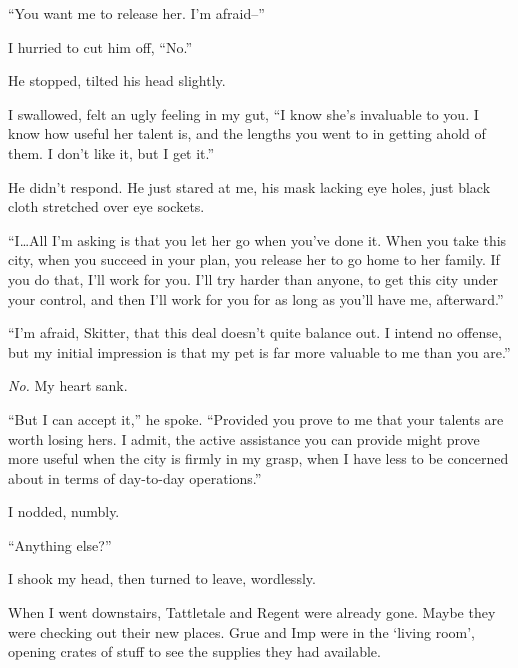 ``You want me to release her.  I'm afraid--''



I hurried to cut him off, ``No.''



He stopped, tilted his head slightly.



I swallowed, felt an ugly feeling in my gut, ``I know she's invaluable to you.  I know how useful her talent is, and the lengths you went to in getting ahold of them.  I don't like it, but I get it.''



He didn't respond.  He just stared at me, his mask lacking eye holes, just black cloth stretched over eye sockets.



``I\ldots All I'm asking is that you let her go when you've done it.  When you take this city, when you succeed in your plan, you release her to go home to her family.  If you do that, I'll work for you.  I'll try harder than anyone, to get this city under your control, and then I'll work for you for as long as you'll have me, afterward.''



``I'm afraid, Skitter, that this deal doesn't quite balance out.  I intend no offense, but my initial impression is that my pet is far more valuable to me than you are.''



\emph{No.}  My heart sank.



``But I can accept it,'' he spoke.  ``Provided you prove to me that your talents are worth losing hers.  I admit, the active assistance you can provide might prove more useful when the city is firmly in my grasp, when I have less to be concerned about in terms of day-to-day operations.''



I nodded, numbly.



``Anything else?''



I shook my head, then turned to leave, wordlessly.



When I went downstairs, Tattletale and Regent were already gone.  Maybe they were checking out their new places.  Grue and Imp were in the `living room', opening crates of stuff to see the supplies they had available.



